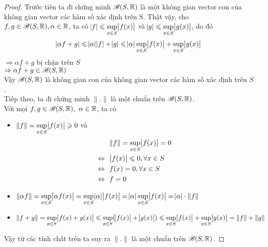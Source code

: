 \begin{proof}
Trước tiên ta đi chứng minh $\mathscr{B}(S,\mathbb R)$ là một không gian vector con của không gian vector các hàm số xác định trên S. Thật vậy, cho $f, g \in \mathscr{B}(S,\mathbb R),\alpha \in \mathbb R$, ta có $\abs{f} \leqslant \displaystyle\sup_{x \in S} \abs{f(x)}$ và $\abs{g} \leqslant \displaystyle\sup_{x \in S} \abs{g(x)}$, do đó
$$
\abs{\alpha f + g}
\leqslant \abs{\alpha} \abs{f} + \abs{g}
\leqslant \abs{\alpha} \displaystyle\sup_{x \in S} \abs{f(x)} + \displaystyle\sup_{x \in S} \abs{g(x)}
$$
$\Rightarrow \alpha f + g$ bị chặn trên $S$\\
$\Rightarrow \alpha f + g \in \mathscr{B}(S,\mathbb R)$\\
Vậy $\mathscr{B}(S,\mathbb R)$ là không gian con của không gian vector các hàm số xác định trên $S$. \QEDFill\\[5mm]
Tiếp theo, ta đi chứng minh $\|.\|$ là một chuẩn trên $\mathscr{B}(S,\mathbb R)$.\\
Với mọi $f, g \in \mathscr{B}(S,\mathbb R),\ \alpha \in \mathbb R$, ta có
\begin{itemize}
    \item $\|f\| = \displaystyle\sup_{x \in S} \abs{f(x)} \geqslant 0$ và
    \begin{align*}
        &\|f\| = \sup_{x \in S} \abs{f(x)} = 0\\
        \Leftrightarrow\ \ &\abs{f(x)} \leqslant 0, \forall x \in S\\
        \Leftrightarrow\ \ &f(x) = 0, \forall x \in S\\
        \Leftrightarrow\ \ &f = 0
    \end{align*}
    \item $\|\alpha f\| = \displaystyle\sup_{x \in S} \abs{\alpha f(x)} = \displaystyle\sup_{x \in S} \abs{\alpha}\abs{f(x)} = \abs{\alpha}\displaystyle\sup_{x \in S} \abs{f(x)} = \abs{\alpha} \cdot \|f\|$
    \item $\|f+g\| = \displaystyle\sup_{x \in S} \abs{f(x) + g(x)} \leqslant \displaystyle\sup_{x \in S} (\abs{f(x)} + \abs{g(x)}) \leqslant \displaystyle\sup_{x \in S} \abs{f(x)} + \displaystyle\sup_{x \in S} \abs{g(x)} = \|f\| + \|g\|$
\end{itemize}
Vậy từ các tính chất trên ta suy ra $\|.\|$ là một chuẩn trên $\mathscr{B}(S,\mathbb R)$.
\end{proof}

